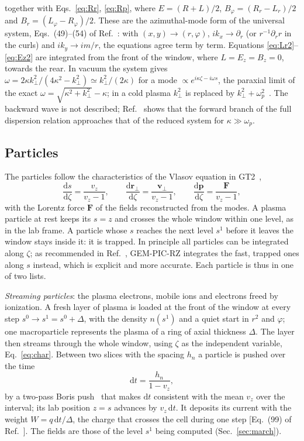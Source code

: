 \documentclass[preprint,12pt]{elsarticle}
\newcommand{\dd}{\mathrm{d}}
\begin{document}
together with Eqs.~\eqref{eq:Rr}, \eqref{eq:Rp}, where $E = (R + L)/2$, $B_\varphi = (R_r - L_r)/2$ and $B_r = (L_\varphi - R_\varphi)/2$. These are the azimuthal-mode form of the universal system, Eqs.~(49)--(54) of Ref.~\cite{GEMPIC}: with $(x, y) \to (r, \varphi)$, $ik_x \to \partial_r$ (or $r^{-1}\partial_r r$ in the curls) and $ik_y \to im/r$, the equations agree term by term. Equations \eqref{eq:Lr2}--\eqref{eq:Ez2} are integrated from the front of the window, where $L = E_z = B_z = 0$, towards the rear. In vacuum the system gives $\omega = 2\kappa k_\perp^2/(4\kappa^2 - k_\perp^2) \simeq k_\perp^2/(2\kappa)$ for a mode $\propto e^{i\kappa\zeta - i\omega s}$, the paraxial limit of the exact $\omega = \sqrt{\kappa^2 + k_\perp^2} - \kappa$; in a cold plasma $k_\perp^2$ is replaced by $k_\perp^2 + \omega_p^2$~\cite{GEMPIC}. The backward wave is not described; Ref.~\cite{GEMPIC} shows that the forward branch of the full dispersion relation approaches that of the reduced system for $\kappa \gg \omega_p$.

\subsection{Particles}\label{sec:particles}

The particles follow the characteristics of the Vlasov equation in GT2~\cite{GEMPIC},
\begin{equation}
\frac{\dd s}{\dd\zeta} = \frac{v_z}{v_z - 1}, \qquad \frac{\dd \bm r_\perp}{\dd\zeta} = \frac{\bm v_\perp}{v_z - 1}, \qquad \frac{\dd \bm p}{\dd\zeta} = \frac{\bm F}{v_z - 1}, \label{eq:char}
\end{equation}
with the Lorentz force $\bm F$ of the fields reconstructed from the modes. A plasma particle at rest keeps its $s = z$ and crosses the whole window within one level, as in the lab frame. A particle whose $s$ reaches the next level $s^1$ before it leaves the window stays inside it: it is trapped. In principle all particles can be integrated along $\zeta$; as recommended in Ref.~\cite{GEMPIC}, GEM-PIC-RZ integrates the fast, trapped ones along $s$ instead, which is explicit and more accurate. Each particle is thus in one of two lists.

\emph{Streaming particles}: the plasma electrons, mobile ions and electrons freed by ionization. A fresh layer of plasma is loaded at the front of the window at every step $s^0 \to s^1 = s^0 + \Delta$, with the density $n(s^1)$ and a quiet start in $r^2$ and $\varphi$; one macroparticle represents the plasma of a ring of axial thickness $\Delta$. The layer then streams through the whole window, using $\zeta$ as the independent variable, Eq.~\eqref{eq:char}. Between two slices with the spacing $h_n$ a particle is pushed over the time
\begin{equation}
\dd t = \frac{h_n}{1 - v_z}, \label{eq:dt}
\end{equation}
by a two-pass Boris push~\cite{Boris1970} that makes $\dd t$ consistent with the mean $v_z$ over the interval; its lab position $z = s$ advances by $v_z\,\dd t$. It deposits its current with the weight $W = q\,\dd t/\Delta$, the charge that crosses the cell during one step [Eq.~(99) of Ref.~\cite{GEMPIC}]. The fields are those of the level $s^1$ being computed (Sec.~\ref{sec:march}).
\end{document}
